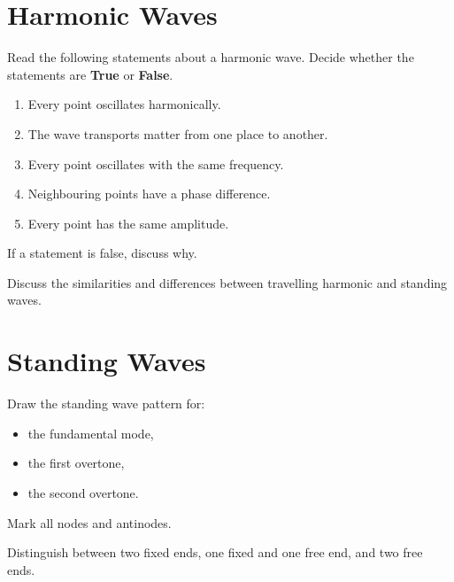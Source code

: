 \documentclass[a4paper,12pt]{article}
\begin{document}
\newpage


\section*{Harmonic Waves}

Read the following statements about a harmonic wave.
Decide whether the statements are \textbf{True} or \textbf{False}.

\begin{enumerate}[label=$\square$]
    \item Every point oscillates harmonically.
    \item The wave transports matter from one place to another.
    \item Every point oscillates with the same frequency.
    \item Neighbouring points have a phase difference.
    \item Every point has the same amplitude.
\end{enumerate}

If a statement is false, discuss why.


\vspace{1cm}

Discuss the similarities and differences between travelling harmonic
and standing waves.


\newpage


\section*{Standing Waves}

Draw the standing wave pattern for:

\begin{itemize}
    \item the fundamental mode,
    \item the first overtone,
    \item the second overtone.
\end{itemize}

Mark all nodes and antinodes.

Distinguish between two fixed ends, one fixed and one free end,
and two free ends.
\end{document}
